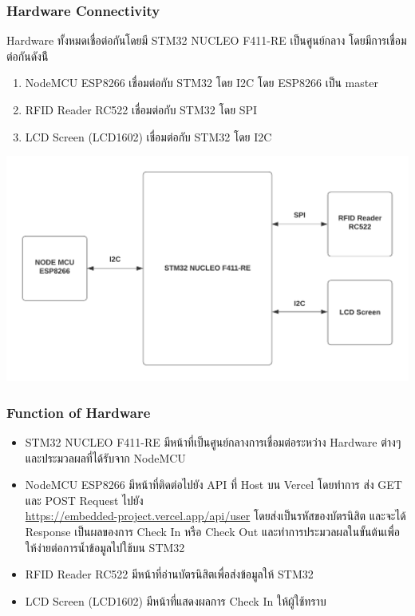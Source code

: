 \documentclass[fontsize=14pt]{extarticle}
\begin{document}
\subsubsection{Hardware Connectivity}
Hardware ทั้งหมดเชื่อต่อกันโดยมี STM32 NUCLEO F411-RE เป็นศูนย์กลาง โดยมีการเชื่อมต่อกันดังน้ี
\begin{enumerate}
    \item NodeMCU ESP8266 เชื่อมต่อกับ STM32 โดย I2C โดย ESP8266 เป็น master
    \item RFID Reader RC522 เชื่อมต่อกับ STM32 โดย SPI
    \item LCD Screen (LCD1602) เชื่อมต่อกับ STM32 โดย I2C
\end{enumerate}
\includegraphics[]{Diagram.png}
\subsubsection{Function of Hardware}
\begin{itemize}
    \item STM32 NUCLEO F411-RE มีหน้าที่เป็นศูนย์กลางการเชื่อมต่อระหว่าง Hardware ต่างๆ และประมวลผลที่ได้รับจาก NodeMCU
    \item NodeMCU ESP8266 มีหน้าที่ติดต่อไปยัง API ที่ Host บน Vercel  โดยทำการ ส่ง GET และ POST Request ไปยัง \\ \url{https://embedded-project.vercel.app/api/user}  โดยส่งเป็นรหัสของบัตรนิสิต และจะได้ Response เป็นผลของการ Check In หรือ Check Out และทำการประมวลผลในขั้นต้นเพื่อให้ง่ายต่อการน้ำข้อมูลไปใช้บน STM32
    \item RFID Reader RC522 มีหน้าที่อ่านบัตรนิสิตเพื่อส่งข้อมูลให้ STM32
    \item LCD Screen (LCD1602) มีหน้าที่แสดงผลการ Check In ให้ผู้ใช้ทราบ
\end{itemize}
\end{document}
